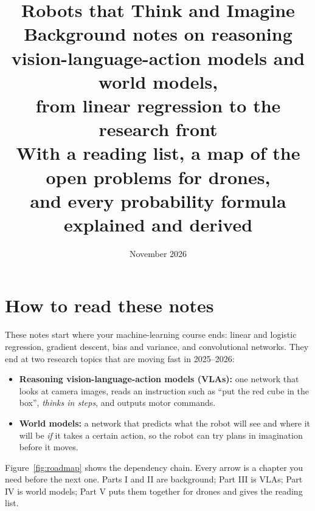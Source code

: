 \documentclass[11pt,a4paper]{article}
\title{\textbf{Robots that Think and Imagine}\\[4pt]
\large Background notes on reasoning vision-language-action models and world models,\\ from linear regression to the research front\\[2pt]
\normalsize With a reading list, a map of the open problems for drones,\\ and every probability formula explained and derived}
\date{November 2026}
\begin{document}
\maketitle
\tableofcontents
\newpage

\section*{How to read these notes}

These notes start where your machine-learning course ends: linear and logistic regression, gradient descent, bias and variance, and convolutional networks. They end at two research topics that are moving fast in 2025--2026:
\begin{itemize}
\item \textbf{Reasoning vision-language-action models (VLAs):} one network that looks at camera images, reads an instruction such as ``put the red cube in the box'', \emph{thinks in steps}, and outputs motor commands.
\item \textbf{World models:} a network that predicts what the robot will see and where it will be \emph{if} it takes a certain action, so the robot can try plans in imagination before it moves.
\end{itemize}
Figure~\ref{fig:roadmap} shows the dependency chain. Every arrow is a chapter you need before the next one. Parts I and II are background; Part III is VLAs; Part IV is world models; Part V puts them together for drones and gives the reading list.
\end{document}
